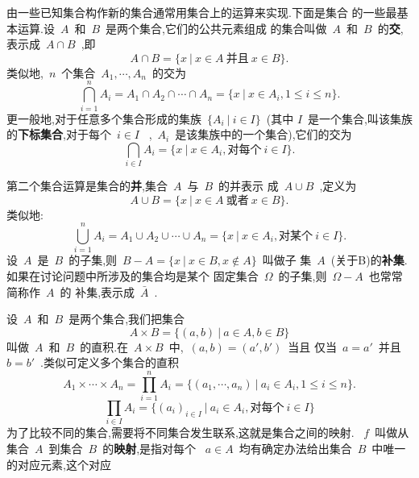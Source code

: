 由一些已知集合构作新的集合通常用集合上的运算来实现.下面是集合
的一些最基本运算.设~$A$~和~$B$~是两个集合,它们的公共元素组成
的集合叫做~$A$~和~$B$~的\textbf{交},表示成~$A \cap B$~,即
\begin{equation*}
    A \cap B = \{x~|~ x \in A~\mbox{并且}~x \in B\}.
\end{equation*}
类似地,~$n$~个集合~$A_1,\cdots,A_n$~的交为
\begin{equation*}
    \bigcap_{i=1}^{n}A_i=A_1 \cap A_2 \cap \cdots \cap A_n = 
    \{x~|~x \in A_i,1 \leq i \leq n\}.
\end{equation*}
更一般地,对于任意多个集合形成的集族~$\{A_i~|~i \in I\}$~(其中
$I$~是一个集合,叫该集族的\textbf{下标集合},对于每个~$i \in I$~
,~$A_i$~是该集族中的一个集合),它们的交为
\begin{equation*}
    \bigcap_{i \in I}A_i = \{x~|~x \in A_i,\mbox{对每个}~i \in I\}.
\end{equation*}\par
第二个集合运算是集合的\textbf{并},集合~$A$~与~$B$~的并表示
成~$A \cup B$~,定义为
\begin{equation*}
    A \cup B = \{x~|~x \in A~\mbox{或者}~x \in B\}.
\end{equation*}
类似地:
\begin{equation*}
    \bigcup^n_{i=1}A_i=A_1 \cup A_2 \cup \cdots \cup A_n = \{
x~|~x \in A_i,\mbox{对某个}~i \in I\}.
\end{equation*}
设~$A$~是~$B$~的子集,则~$B-A=\{x~|~x \in B,x \notin A\}$~叫做子
集~$A$~(关于B)的\textbf{补集}.如果在讨论问题中所涉及的集合均是某个
固定集合~$\varOmega$~的子集,则~$\varOmega-A$~也常常简称作~$A$~的
补集,表示成~$\bar{A}$~.\par
设~$A$~和~$B$~是两个集合,我们把集合
\begin{equation*}
    A \times B = \{(a,b)~|~a \in A,b \in B\}
\end{equation*}
叫做~$A$~和~$B$~的直积.在~$A \times B$~中,~$(a,b)=(a',b')$~当且
仅当~$a=a'$~并且~$b=b'$~.类似可定义多个集合的直积
\begin{equation*}
    A_1 \times \cdots \times A_n = \prod^n_{i=1}A_i=\{(a_1,
    \cdots,a_n)~|~a_i \in A_i,1 \leq i \leq n\}.
\end{equation*}
\begin{equation*}
    \prod_{i \in I}A_i = \{(a_i)_{i \in I}~|~a_i \in A_i,
    \mbox{对每个}~i \in I\}
\end{equation*}
为了比较不同的集合,需要将不同集合发生联系,这就是集合之间的映射.
~$f$~叫做从集合~$A$~到集合~$B$~的\textbf{映射},是指对每个
~$a \in A$~均有确定办法给出集合~$B$~中唯一的对应元素,这个对应
